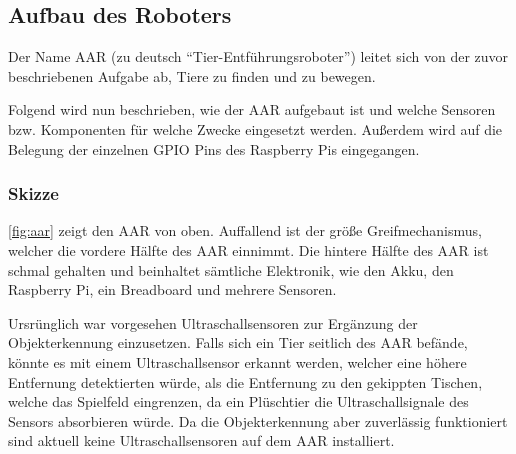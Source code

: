 \subsection{Aufbau des Roboters}
Der Name \ac{AAR} (zu deutsch \enquote{Tier-Entführungsroboter}) leitet sich von der zuvor beschriebenen Aufgabe ab, Tiere zu finden und zu bewegen.

Folgend wird nun beschrieben, wie der \ac{AAR} aufgebaut ist und welche Sensoren bzw. Komponenten für welche Zwecke eingesetzt werden.
Außerdem wird auf die Belegung der einzelnen \ac{GPIO} Pins des Raspberry Pis eingegangen.

\subsubsection{Skizze}


\autoref{fig:aar} zeigt den \ac{AAR} von oben.
Auffallend ist der größe Greifmechanismus, welcher die vordere Hälfte des \ac{AAR} einnimmt.
Die hintere Hälfte des \ac{AAR} ist schmal gehalten und beinhaltet sämtliche Elektronik, wie den Akku, den Raspberry Pi, ein Breadboard und mehrere Sensoren. 

Ursrünglich war vorgesehen Ultraschallsensoren zur Ergänzung der Objekterkennung einzusetzen.
Falls sich ein Tier seitlich des \ac{AAR} befände, könnte es mit einem Ultraschallsensor erkannt werden, welcher eine höhere Entfernung detektierten würde, als die Entfernung zu den gekippten Tischen, welche das Spielfeld eingrenzen, da ein Plüschtier die Ultraschallsignale des Sensors absorbieren würde.
Da die Objekterkennung aber zuverlässig funktioniert sind aktuell keine Ultraschallsensoren auf dem \ac{AAR} installiert.


